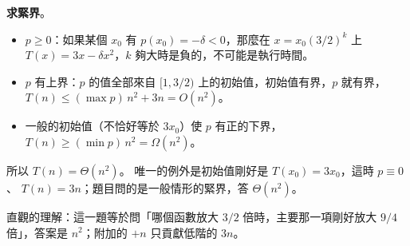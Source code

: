 \begin{pastsoln}
\textbf{求緊界}。
\begin{itemize}
\item $p \ge 0$：如果某個 $x_0$ 有 $p(x_0) = -\delta < 0$，那麼在 $x = x_0(3/2)^k$ 上
$T(x) = 3x - \delta x^2$，$k$ 夠大時是負的，不可能是執行時間。
\item $p$ 有上界：$p$ 的值全部來自 $[1, 3/2)$ 上的初始值，初始值有界，$p$ 就有界，
$T(n) \le (\max p)\, n^2 + 3n = O(n^2)$。
\item 一般的初始值（不恰好等於 $3x_0$）使 $p$ 有正的下界，$T(n) \ge (\min p)\, n^2 = \Omega(n^2)$。
\end{itemize}
所以 $T(n) = \Theta(n^2)$。 唯一的例外是初始值剛好是 $T(x_0) = 3x_0$，這時 $p \equiv 0$、
$T(n) = 3n$；題目問的是一般情形的緊界，答 $\Theta(n^2)$。

直觀的理解：這一題等於問「哪個函數放大 $3/2$ 倍時，主要那一項剛好放大 $9/4$ 倍」，答案是
$n^2$；附加的 $+n$ 只貢獻低階的 $3n$。
\end{pastsoln}
